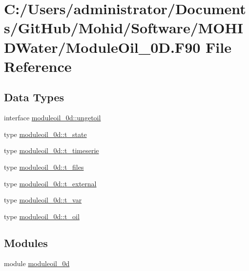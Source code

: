 \hypertarget{_module_oil__0_d_8_f90}{}\section{C\+:/\+Users/administrator/\+Documents/\+Git\+Hub/\+Mohid/\+Software/\+M\+O\+H\+I\+D\+Water/\+Module\+Oil\+\_\+0D.F90 File Reference}
\label{_module_oil__0_d_8_f90}
\subsection*{Data Types}
\begin{DoxyCompactItemize}
\item 
interface \mbox{\hyperlink{interfacemoduleoil__0d_1_1ungetoil}{moduleoil\+\_\+0d\+::ungetoil}}
\item 
type \mbox{\hyperlink{structmoduleoil__0d_1_1t__state}{moduleoil\+\_\+0d\+::t\+\_\+state}}
\item 
type \mbox{\hyperlink{structmoduleoil__0d_1_1t__timeserie}{moduleoil\+\_\+0d\+::t\+\_\+timeserie}}
\item 
type \mbox{\hyperlink{structmoduleoil__0d_1_1t__files}{moduleoil\+\_\+0d\+::t\+\_\+files}}
\item 
type \mbox{\hyperlink{structmoduleoil__0d_1_1t__external}{moduleoil\+\_\+0d\+::t\+\_\+external}}
\item 
type \mbox{\hyperlink{structmoduleoil__0d_1_1t__var}{moduleoil\+\_\+0d\+::t\+\_\+var}}
\item 
type \mbox{\hyperlink{structmoduleoil__0d_1_1t__oil}{moduleoil\+\_\+0d\+::t\+\_\+oil}}
\end{DoxyCompactItemize}
\subsection*{Modules}
\begin{DoxyCompactItemize}
\item 
module \mbox{\hyperlink{namespacemoduleoil__0d}{moduleoil\+\_\+0d}}
\end{DoxyCompactItemize}
